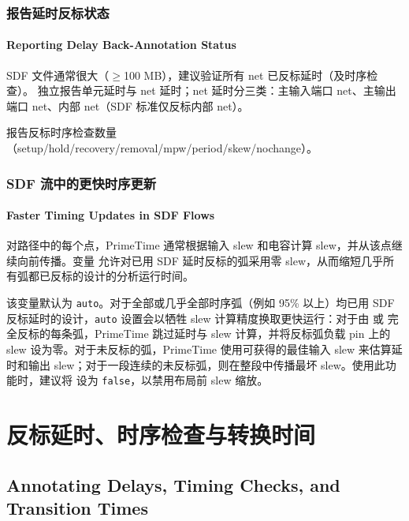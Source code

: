 \subsubsection{报告延时反标状态}
\paragraph*{Reporting Delay Back-Annotation Status}

SDF 文件通常很大（$\geq$100 MB），建议验证所有 net 已反标延时（及时序检查）。 独立报告单元延时与 net 延时；net 延时分三类：主输入端口 net、主输出端口 net、内部 net（SDF 标准仅反标内部 net）。

 报告反标时序检查数量（setup/hold/recovery/removal/mpw/period/skew/nochange）。

\subsubsection{SDF 流中的更快时序更新}
\paragraph*{Faster Timing Updates in SDF Flows}

对路径中的每个点，PrimeTime 通常根据输入 slew 和电容计算 slew，并从该点继续向前传播。变量  允许对已用 SDF 延时反标的弧采用零 slew，从而缩短几乎所有弧都已反标的设计的分析运行时间。

该变量默认为 \texttt{auto}。对于全部或几乎全部时序弧（例如 95\% 以上）均已用 SDF 反标延时的设计，\texttt{auto} 设置会以牺牲 slew 计算精度换取更快运行：对于由  或  完全反标的每条弧，PrimeTime 跳过延时与 slew 计算，并将反标弧负载 pin 上的 slew 设为零。对于未反标的弧，PrimeTime 使用可获得的最佳输入 slew 来估算延时和输出 slew；对于一段连续的未反标弧，则在整段中传播最坏 slew。使用此功能时，建议将  设为 \texttt{false}，以禁用布局前 slew 缩放。

\section{反标延时、时序检查与转换时间}
\subsection*{Annotating Delays, Timing Checks, and Transition Times}

